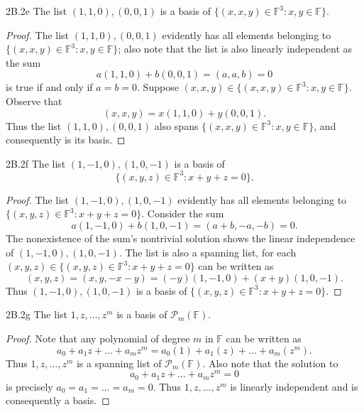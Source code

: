 \documentclass{exam}
\begin{document}
\begin{problem}{2B.2e}
    The list $(1, 1, 0), (0, 0, 1)$ is a basis of $\{(x, x, y)\in\mathbb F^3:x, y\in\mathbb F\}$.
\end{problem}

\begin{proof}
    The list $(1, 1, 0), (0, 0, 1)$ evidently has all elements belonging to $\{(x, x, y)\in\mathbb F^3:x, y\in\mathbb F\}$; also note that the list is also linearly independent as the sum \[
        a(1, 1, 0) + b(0, 0, 1) = (a, a, b) = 0
    \]
    is true if and only if $a = b = 0$. Suppose $(x, x, y)\in\{(x, x, y)\in\mathbb F^3:x, y\in\mathbb F\}$. Observe that \[
        (x, x, y) = x(1, 1, 0) + y(0, 0, 1).
    \]
    Thus the list $(1, 1, 0), (0, 0, 1)$ also spans $\{(x, x, y)\in\mathbb F^3:x, y\in\mathbb F\}$, and consequently is its basis.
\end{proof}

\begin{problem}{2B.2f}
    The list $(1, -1, 0), (1, 0, -1)$ is a basis of \[
        \{(x, y, z)\in\mathbb F^3:x + y + z = 0\}.
    \]
\end{problem}

\begin{proof}
    The list $(1, -1, 0), (1, 0, -1)$ evidently has all elements belonging to $\{(x, y, z)\in\mathbb F^3:x + y + z = 0\}$. Consider the sum \[
        a(1, -1, 0) + b(1, 0, -1) = (a + b, -a, -b)= 0.
    \]
    The nonexistence of the sum's nontrivial solution shows the linear independence of $(1, -1, 0), (1, 0, -1)$. The list is also a spanning list, for each $(x, y, z)\in\{(x, y, z)\in\mathbb F^3:x + y + z = 0\}$ can be written as \[
        (x, y, z) = (x, y, -x-y) = (-y)(1, -1, 0) + (x+y)(1, 0, -1).
    \]
    Thus $(1, -1, 0), (1, 0, -1)$ is a basis of $\{(x, y, z)\in\mathbb F^3:x + y + z = 0\}$.
\end{proof}

\begin{problem}{2B.2g}
    The list $1, z, \dots, z^m$ is a basis of $\mathcal P_m(\mathbb F)$.
\end{problem}

\begin{proof}
    Note that any polynomial of degree $m$ in $\mathbb F$ can be written as \[
        a_0 + a_1z + \dots + a_mz^m = a_0(1) + a_1(z) + \dots + a_m(z^m).
    \]
    Thus $1, z, \dots, z^m$ is a spanning list of $\mathcal P_m(\mathbb F)$. Also note that the solution to \[
        a_0 + a_1z + \dots + a_mz^m = 0
    \]
    is precisely $a_0=a_1=\dots=a_m=0$. Thus $1, z, \dots, z^m$ is linearly independent and is consequently a basis.
\end{proof}
\end{document}
